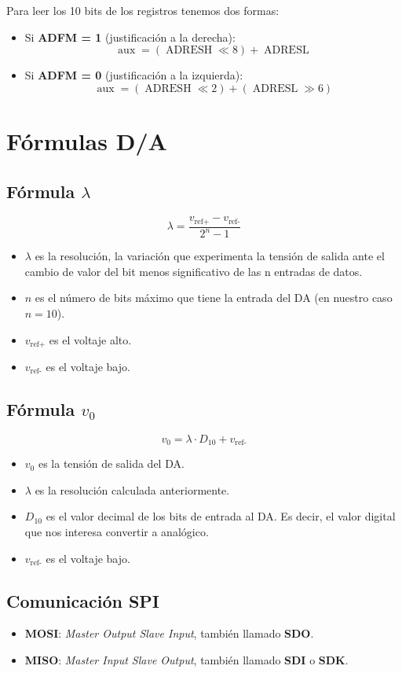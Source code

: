 \documentclass{article}
\theoremstyle{definition} %
\begin{document}
\newpage
Para leer los 10 bits de los registros tenemos dos formas:
\begin{itemize}
  \item Si \textbf{ADFM = 1} (justificación a la derecha):
  \[
    \operatorname{aux} = (\operatorname{ADRESH} \ll 8) + \operatorname{ADRESL}
  \]
  \item Si \textbf{ADFM = 0} (justificación a la izquierda):
  \[
    \operatorname{aux} = (\operatorname{ADRESH} \ll 2) + (\operatorname{ADRESL} \gg 6)
  \]
\end{itemize}

\section{Fórmulas D/A}
\subsection{Fórmula $\lambda$}
\large
\[ \lambda = \frac{v_{\text{ref+}}-v_{\text{ref-}}}{2^n-1} \]
\normalsize
\begin{itemize}
  \item $\lambda$ es la resolución, la variación que experimenta la tensión de salida ante el cambio de valor del bit menos significativo de las n entradas de datos.
  \item $n$ es el número de bits máximo que tiene la entrada del DA (en nuestro caso $n = 10$).
  \item $v_{\text{ref+}}$ es el voltaje alto. 
  \item $v_{\text{ref-}}$ es el voltaje bajo.
\end{itemize}
\subsection{Fórmula $v_{0}$}
\large
\[v_{0} = \lambda \cdot D_{10} + v_{\text{ref-}}\]
\normalsize
\begin{itemize}
  \item $v_{0}$ es la tensión de salida del DA.
  \item $\lambda$ es la resolución calculada anteriormente.
  \item $D_{10}$ es el valor decimal de los bits de entrada al DA. Es decir, el valor digital que nos interesa convertir a analógico.
  \item $v_{\text{ref-}}$ es el voltaje bajo.
\end{itemize}

\subsection{Comunicación SPI}
\begin{itemize}
  \item \textbf{MOSI}: \textit{Master Output Slave Input}, también llamado \textbf{SDO}.
  \item \textbf{MISO}: \textit{Master Input Slave Output}, también llamado \textbf{SDI} o \textbf{SDK}.
\end{itemize}
\end{document}
